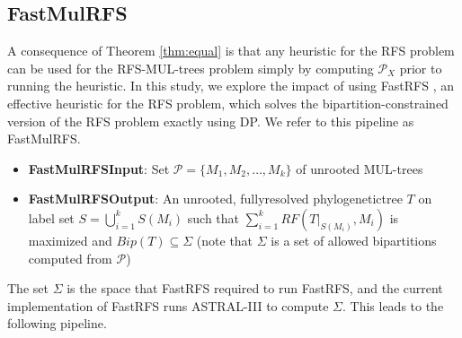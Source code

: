 \subsection{FastMulRFS}
A consequence of Theorem \ref{thm:equal} is that any heuristic for the RFS problem can be used for the RFS-MUL-trees problem simply by computing $\mathcal{P}_X$ prior to running the heuristic.
In this study, we explore the impact of using FastRFS \cite{vachaspati2015fastrfs}, an effective heuristic for the RFS problem, which solves the bipartition-constrained version of the RFS problem exactly using DP.
We refer to this pipeline as FastMulRFS.
\begin{itemize}
	\item \textbf{\gls{FastMulRFSInput}}: Set $\mathcal{P} = \{M_1, M_2, \dots, M_k\}$ of \gls{unrooted}  \glspl{MUL-tree}
	\item \textbf{\gls{FastMulRFSOutput}}: An unrooted, \gls{fullyresolved} \gls{phylogenetictree} $T$ on label set $S = \bigcup_{i=1}^k S(M_i)$ such that 
	$\sum_{i=1}^k RF(T |_{S(M_i)}, M_i)$ is maximized
	and $Bip(T) \subseteq \Sigma$ (note that $\Sigma$ is a set of allowed \glspl{bipartition} computed from $\mathcal{P}$)
\end{itemize}
The set $\Sigma$ is the space that FastRFS required to run FastRFS, and the current implementation of FastRFS runs ASTRAL-III to compute $\Sigma$. This leads to the following pipeline.

\vspace{12pt}

